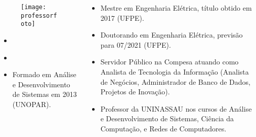 \begin{frame}[t]

  \begin{columns}

    \begin{column}{0.5\linewidth}
      \begin{figure}[htb]
        \centering{}
        \texttt{[image: \\professorfoto]}

        \textbf{\href{\professorlattes}{\professor}}
      \end{figure}

      \begin{itemize}
        \justifying{}
        \setlength\itemsep{1em}
        \item \href{\professorsite}{\professorsite}
        \item \href{\professorlattes}{\professorlattes}
        \item Formado em Análise e Desenvolvimento de Sistemas em 2013 (UNOPAR).
      \end{itemize}
    \end{column}

    \begin{column}{0.5\linewidth}
      \begin{itemize}
      \justifying{}
      \setlength\itemsep{1em}
      \item Mestre em Engenharia Elétrica, título obtido em 2017 (UFPE).
      \item Doutorando em Engenharia Elétrica, previsão para 07/2021 (UFPE).
      \item Servidor Público na Compesa atuando como Analista de Tecnologia da Informação (Analista de Negócios, Administrador de Banco de Dados, Projetos de Inovação).
      \item Professor da UNINASSAU nos cursos de Análise e Desenvolvimento de Sistemas, Ciência da Computação, e Redes de Computadores.
      \end{itemize}
    \end{column}

  \end{columns}

\end{frame}
